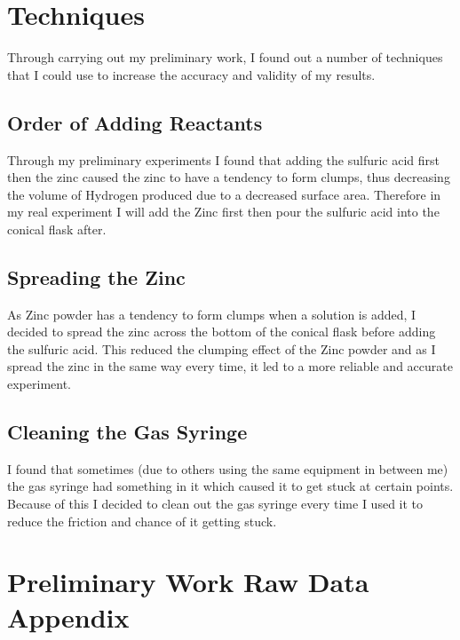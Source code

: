 \section {Techniques}

Through carrying out my preliminary work, I found out a number of techniques that I could use to increase the accuracy and validity of my results.

	\subsection{Order of Adding Reactants}

Through my preliminary experiments I found that adding the sulfuric acid first then the zinc caused the zinc to have a tendency to form clumps, thus decreasing the volume of Hydrogen produced due to a decreased surface area. Therefore in my real experiment I will add the Zinc first then pour the sulfuric acid into the conical flask after.

	\subsection{Spreading the Zinc}

As Zinc powder has a tendency to form clumps when a solution is added, I decided to spread the zinc across the bottom of the conical flask before adding the sulfuric acid. This reduced the clumping effect of the Zinc powder and as I spread the zinc in the same way every time, it led to a more reliable and accurate experiment.

	\subsection{Cleaning the Gas Syringe}

I found that sometimes (due to others using the same equipment in between me) the gas syringe had something in it which caused it to get stuck at certain points. Because of this I decided to clean out the gas syringe every time I used it to reduce the friction and chance of it getting stuck.


\section{Preliminary Work Raw Data Appendix}

